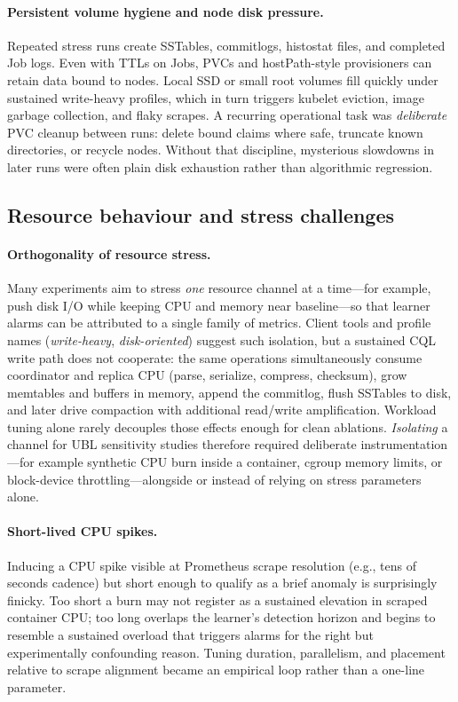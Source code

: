 \documentclass[sigconf]{acmart}
\begin{document}
\paragraph{Persistent volume hygiene and node disk pressure.}
Repeated stress runs create SSTables, commitlogs, histostat files, and completed Job logs. Even with TTLs on Jobs, PVCs and hostPath-style provisioners can retain data bound to nodes. Local SSD or small root volumes fill quickly under sustained write-heavy profiles, which in turn triggers kubelet eviction, image garbage collection, and flaky scrapes. A recurring operational task was \emph{deliberate} PVC cleanup between runs: delete bound claims where safe, truncate known directories, or recycle nodes. Without that discipline, mysterious slowdowns in later runs were often plain disk exhaustion rather than algorithmic regression.

%
\subsection{Resource behaviour and stress challenges}
\label{subsec:challenges-stress}

\paragraph{Orthogonality of resource stress.}
Many experiments aim to stress \emph{one} resource channel at a time---for example, push disk I/O while keeping CPU and memory near baseline---so that learner alarms can be attributed to a single family of metrics. Client tools and profile names (\emph{write-heavy}, \emph{disk-oriented}) suggest such isolation, but a sustained CQL write path does not cooperate: the same operations simultaneously consume coordinator and replica CPU (parse, serialize, compress, checksum), grow memtables and buffers in memory, append the commitlog, flush SSTables to disk, and later drive compaction with additional read/write amplification. Workload tuning alone rarely decouples those effects enough for clean ablations. \emph{Isolating} a channel for UBL sensitivity studies therefore required deliberate instrumentation---for example synthetic CPU burn inside a container, cgroup memory limits, or block-device throttling---alongside or instead of relying on stress parameters alone.

\paragraph{Short-lived CPU spikes.}
Inducing a CPU spike visible at Prometheus scrape resolution (e.g., tens of seconds cadence) but short enough to qualify as a brief anomaly is surprisingly finicky. Too short a burn may not register as a sustained elevation in scraped container CPU; too long overlaps the learner's detection horizon and begins to resemble a sustained overload that triggers alarms for the right but experimentally confounding reason. Tuning duration, parallelism, and placement relative to scrape alignment became an empirical loop rather than a one-line parameter.
\end{document}
